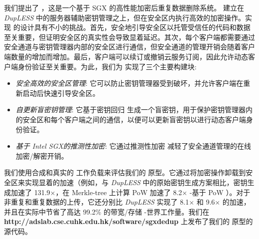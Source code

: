 我们提出了 \sysnameS，这是一个基于 SGX 的高性能加密后重复数据删除系统。 \sysnameS 建立在 {\em DupLESS} \cite{bellare13b} 中的服务器辅助密钥管理之上，但在安全区内执行高效的加密操作。实现 \sysnameS 的设计具有不小的挑战。首先，安全地引导安全区以托管受信任的代码和数据至关重要，但证明安全区的真实性会导致显着延迟。其次，每个客户端都需要通过安全通道与密钥管理器内部的安全区进行通信，但安全通道的管理开销会随着客户端数量的增加而增加。最后，客户端可以续订或撤销云服务订阅，因此允许动态客户端身份验证至关重要。为此，我们为 \sysnameS 实现了三个主要构建块: 

\begin{itemize}[leftmargin=*]
    \item \textit{安全高效的安全区管理}:
        它可以防止密钥管理器受到破坏，并允许客户端在重新启动后快速引导安全区。
    \item \textit{自更新盲密钥管理}:
        它基于密钥回归 \cite{fu06} 生成一个盲密钥，用于保护密钥管理器内的安全区和每个客户端之间的通信，以便可以更新盲密钥以进行动态客户端身份验证。
    \item \textit{基于 Intel SGX的推测性加密}:
        它通过推测性加密 \cite{eduardo19} 减轻了安全通道管理的在线加密/解密开销。
\end{itemize}

我们使用合成和真实的 \cite{fsl,meyer11} 工作负载来评估我们的 \sysnameS 原型。它通过将加密操作卸载到安全区来实现显着的加速（例如，与 {\em DupLESS} \cite{bellare13b} 中的原始密钥生成方案相比，密钥生成加速了 131.9$\times$，在 Merkle-tree 上计算 PoW 加速了 8.2$\times$ -基于 PoW \cite{halevi11}）。对于非重复和重复数据的上传，它还分别比 {\em DupLESS} \cite{bellare13b} 实现了 8.1$\times$ 和 9.6$\times$ 的加速，并且在实际中节省了高达 99.2\% 的带宽/存储 -世界工作量。我们在 {\bf http://adslab.cse.cuhk.edu.hk/software/sgxdedup} 上发布了我们的 \sysnameS 原型的源代码。 

